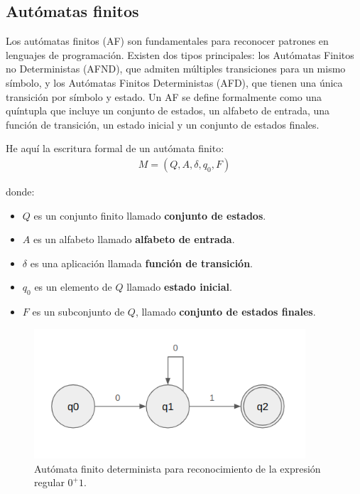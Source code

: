 \subsection{Autómatas finitos}\label{subsection:AF}
Los autómatas finitos (AF) son fundamentales para reconocer patrones en lenguajes de programación. Existen dos tipos principales: los Autómatas Finitos no Deterministas (AFND), que admiten múltiples transiciones para un mismo símbolo, y los Autómatas Finitos Deterministas (AFD), que tienen una única transición por símbolo y estado. Un AF se define formalmente como una quíntupla que incluye un conjunto de estados, un alfabeto de entrada, una función de transición, un estado inicial y un conjunto de estados finales.

\noindent
He aquí la escritura formal de un autómata finito:
\begin{align*}
    M = (Q,A,\delta,q_0,F)
\end{align*}

\noindent
donde:
\begin{itemize}
    \item $Q$ es un conjunto finito llamado \textbf{conjunto de estados}.
    \item $A$ es un alfabeto llamado \textbf{alfabeto de entrada}.
    \item $\delta$ es una aplicación llamada \textbf{función de transición}.
    \item $q_0$ es un elemento de $Q$ llamado \textbf{estado inicial}.
    \item $F$ es un subconjunto de $Q$, llamado \textbf{conjunto de estados finales}.
\end{itemize}

\begin{figure}[h]
    \centering
    \includegraphics[width=0.9\textwidth]{images/pl/auto1.png}
    \caption{Autómata finito determinista para reconocimiento de la expresión regular $0^+1$.}
    \label{fig:PLAutomt}
\end{figure}

